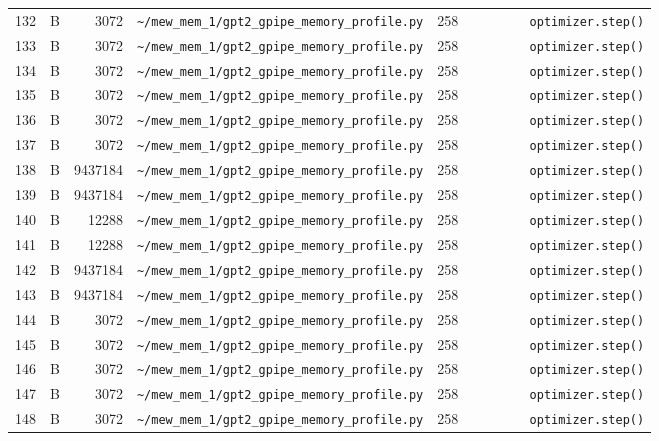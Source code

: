 \documentclass{article}
\begin{document}
\begin{longtable}{r l r p{6.5cm} r p{7.0cm}}
132 & B & 3072 & \lstinline|~/mew_mem_1/gpt2_gpipe_memory_profile.py| & 258 & \lstinline|        optimizer.step()| \\
133 & B & 3072 & \lstinline|~/mew_mem_1/gpt2_gpipe_memory_profile.py| & 258 & \lstinline|        optimizer.step()| \\
134 & B & 3072 & \lstinline|~/mew_mem_1/gpt2_gpipe_memory_profile.py| & 258 & \lstinline|        optimizer.step()| \\
135 & B & 3072 & \lstinline|~/mew_mem_1/gpt2_gpipe_memory_profile.py| & 258 & \lstinline|        optimizer.step()| \\
136 & B & 3072 & \lstinline|~/mew_mem_1/gpt2_gpipe_memory_profile.py| & 258 & \lstinline|        optimizer.step()| \\
137 & B & 3072 & \lstinline|~/mew_mem_1/gpt2_gpipe_memory_profile.py| & 258 & \lstinline|        optimizer.step()| \\
138 & B & 9437184 & \lstinline|~/mew_mem_1/gpt2_gpipe_memory_profile.py| & 258 & \lstinline|        optimizer.step()| \\
139 & B & 9437184 & \lstinline|~/mew_mem_1/gpt2_gpipe_memory_profile.py| & 258 & \lstinline|        optimizer.step()| \\
140 & B & 12288 & \lstinline|~/mew_mem_1/gpt2_gpipe_memory_profile.py| & 258 & \lstinline|        optimizer.step()| \\
141 & B & 12288 & \lstinline|~/mew_mem_1/gpt2_gpipe_memory_profile.py| & 258 & \lstinline|        optimizer.step()| \\
142 & B & 9437184 & \lstinline|~/mew_mem_1/gpt2_gpipe_memory_profile.py| & 258 & \lstinline|        optimizer.step()| \\
143 & B & 9437184 & \lstinline|~/mew_mem_1/gpt2_gpipe_memory_profile.py| & 258 & \lstinline|        optimizer.step()| \\
144 & B & 3072 & \lstinline|~/mew_mem_1/gpt2_gpipe_memory_profile.py| & 258 & \lstinline|        optimizer.step()| \\
145 & B & 3072 & \lstinline|~/mew_mem_1/gpt2_gpipe_memory_profile.py| & 258 & \lstinline|        optimizer.step()| \\
146 & B & 3072 & \lstinline|~/mew_mem_1/gpt2_gpipe_memory_profile.py| & 258 & \lstinline|        optimizer.step()| \\
147 & B & 3072 & \lstinline|~/mew_mem_1/gpt2_gpipe_memory_profile.py| & 258 & \lstinline|        optimizer.step()| \\
148 & B & 3072 & \lstinline|~/mew_mem_1/gpt2_gpipe_memory_profile.py| & 258 & \lstinline|        optimizer.step()| \\

\end{longtable}
\end{document}
